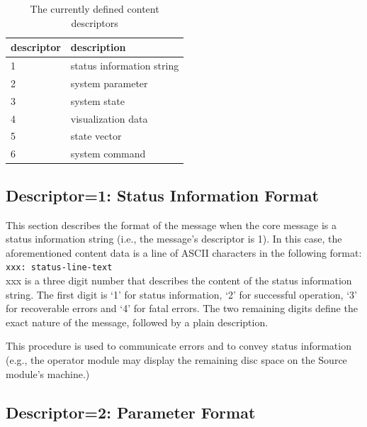 \documentclass[letterpaper,oneside,12pt]{book}
\begin{document}
\begin{table}[ht]
 \centering
 \begin{tabular}{|l|l|}
  \hline
  \textbf{descriptor} & \textbf{description} \\
  \hline
  1 & status information string \\
  \hline
  2 & system parameter \\
  \hline
  3 & system state \\
  \hline
  4 & visualization data \\
  \hline
  5 & state vector \\
  \hline
  6 & system command \\
  \hline
 \end{tabular}
 \caption{The currently defined content descriptors}
\end{table}   


\subsection{Descriptor=1: Status Information Format}
\label{statusinfo_format}

This section describes the format of the message when the core message is 
a status information string (i.e., the message's descriptor is 1). In this 
case, the aforementioned content data is a line of ASCII characters 
in the following format:
\\[2ex]
\verb|xxx: status-line-text| 
\\[2ex]
xxx is a three digit number that describes the content of the status information string. 
The first digit is `1' for status information, `2' for successful operation, `3' 
for recoverable errors and `4' for fatal errors. The two remaining digits define 
the exact nature of the message, followed by a plain description.

This procedure is used to communicate errors and to convey status information (e.g.,
the operator module may display the remaining disc space on the Source module's
machine.)

\subsection{Descriptor=2: Parameter Format}
\label{parameter_format}
\end{document}
